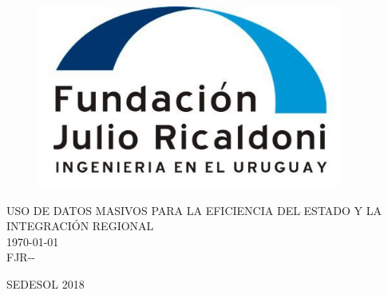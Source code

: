 \label{finalpg}
\clearpage

\thispagestyle{empty}
\begin{center}
\vfill
\begin{figure}
\centering
\vspace{3cm}
  \includegraphics[width=10cm]{images/LOGO_FJR}
\end{figure}
\vfill
{\large USO DE DATOS MASIVOS PARA LA EFICIENCIA DEL ESTADO Y LA INTEGRACIÓN REGIONAL\\[0.5cm] }
{\large \today \\[0.5cm] }
{\large FJR-\DelNumber-\DelVersion\\[0.5cm] }
\vfill

SEDESOL 2018

\doclicenseLicense
\end{center}
